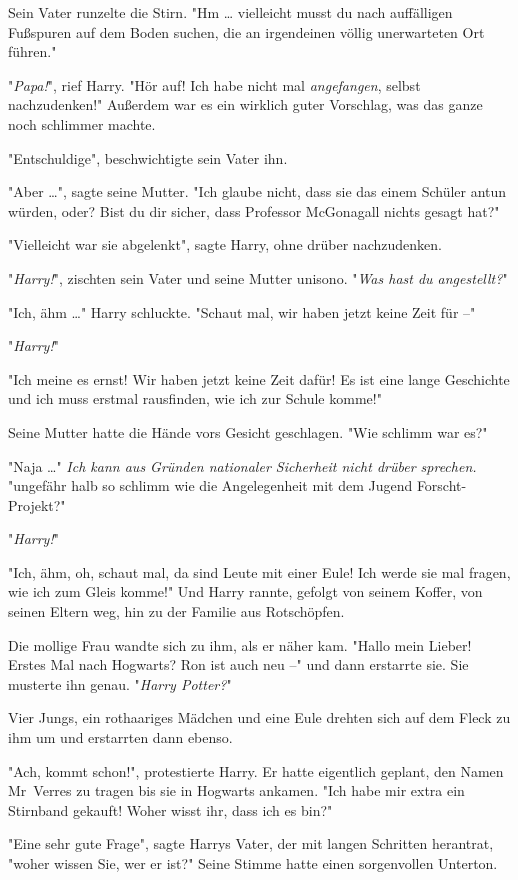 {Sein Vater runzelte die Stirn. "Hm … vielleicht musst du nach auffälligen Fußspuren auf dem Boden suchen, die an irgendeinen völlig unerwarteten Ort führen."

"\emph{Papa!}", rief Harry. "Hör auf! Ich habe nicht mal \emph{angefangen}, selbst nachzudenken!" Außerdem war es ein wirklich guter Vorschlag, was das ganze noch schlimmer machte.

"Entschuldige", beschwichtigte sein Vater ihn.

"Aber …", sagte seine Mutter. "Ich glaube nicht, dass sie das einem Schüler antun würden, oder? Bist du dir sicher, dass Professor McGonagall nichts gesagt hat?"

"Vielleicht war sie abgelenkt", sagte Harry, ohne drüber nachzudenken.

"\emph{Harry!}", zischten sein Vater und seine Mutter unisono. "\emph{Was hast du angestellt?}"

"Ich, ähm …" Harry schluckte. "Schaut mal, wir haben jetzt keine Zeit für --"

"\emph{Harry!}"

"Ich meine es ernst! Wir haben jetzt keine Zeit dafür! Es ist eine lange Geschichte und ich muss erstmal rausfinden, wie ich zur Schule komme!"

Seine Mutter hatte die Hände vors Gesicht geschlagen. "Wie schlimm war es?"

"Naja …" \emph{Ich kann aus Gründen nationaler Sicherheit nicht drüber sprechen.} "ungefähr halb so schlimm wie die Angelegenheit mit dem Jugend Forscht-Projekt?"

"\emph{Harry!}"

"Ich, ähm, oh, schaut mal, da sind Leute mit einer Eule! Ich werde sie mal fragen, wie ich zum Gleis komme!" Und Harry rannte, gefolgt von seinem Koffer, von seinen Eltern weg, hin zu der Familie aus Rotschöpfen.

Die mollige Frau wandte sich zu ihm, als er näher kam. "Hallo mein Lieber! Erstes Mal nach Hogwarts? Ron ist auch neu --" und dann erstarrte sie. Sie musterte ihn genau. "\emph{Harry Potter?}"

Vier Jungs, ein rothaariges Mädchen und eine Eule drehten sich auf dem Fleck zu ihm um und erstarrten dann ebenso.

"Ach, kommt schon!", protestierte Harry. Er hatte eigentlich geplant, den Namen Mr~Verres zu tragen bis sie in Hogwarts ankamen. "Ich habe mir extra ein Stirnband gekauft! Woher wisst ihr, dass ich es bin?"

"Eine sehr gute Frage", sagte Harrys Vater, der mit langen Schritten herantrat, "woher wissen Sie, wer er ist?" Seine Stimme hatte einen sorgenvollen Unterton.

}
